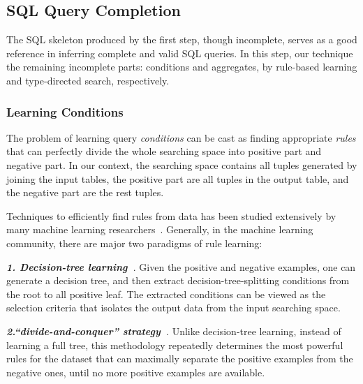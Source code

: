 \subsection{SQL Query Completion}
\label{sec:completion}

The SQL skeleton produced by the first step, though incomplete,
serves as a good reference in inferring complete and valid SQL queries.
In this step, our technique the remaining incomplete parts: conditions and
aggregates, by rule-based learning and type-directed search, respectively.

\subsubsection{Learning Conditions}
\label{sec:decision_tree}

The problem of learning query \textit{conditions} can be cast as finding
appropriate \textit{rules} that can perfectly divide the whole searching space
into positive part and negative part. In our context, the searching space
contains all tuples generated by joining the input tables, the positive part
are all tuples in the output table, and the negative part are the rest
tuples.


Techniques to efficiently find rules from data has been studied extensively
by many machine learning researchers~\cite{Quinlan:1993, Cohen:1995, Frank:1998}.
Generally, in the machine learning community, there are major two paradigms of
rule learning:

\vspace{1mm}
\noindent\textbf{\textit{1. Decision-tree learning~\cite{Quinlan:1993}}}. Given
the positive and negative examples, one can generate a decision
tree, and then extract decision-tree-splitting conditions from the root to
all positive leaf. The extracted conditions can be viewed as the selection
criteria that isolates the output data from the input searching space.


\vspace{1mm}
\noindent\textbf{\textit{2.``divide-and-conquer'' strategy~\cite{Pagallo:1990}}}. 
Unlike decision-tree learning, instead of learning a full tree,
this methodology repeatedly determines the most powerful rules for the dataset
that can maximally separate the positive examples from the negative ones, until
no more positive examples are available.

